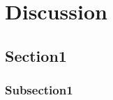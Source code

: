 \documentclass[thesis.tex]{subfiles}
\begin{document}
\chapter{Discussion}

\section{Section1}

\subsection{Subsection1}
\end{document}
